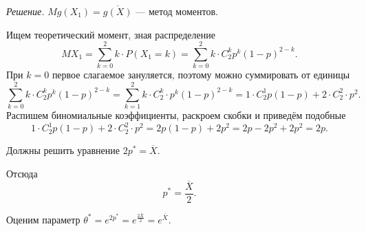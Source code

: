 \textit{Решение.} $Mg \left( X_1 \right) = \overline{g \left( X \right) }$ --- метод моментов.

Ищем теоретический момент, зная распределение
$$MX_1 =
  \sum \limits_{k = 0}^2 k \cdot P \left( X_1 = k \right) =
  \sum \limits_{k = 0}^2 k \cdot C_2^k p^k \left( 1 - p \right)^{2 - k}.$$
При $k = 0$ первое слагаемое зануляется, поэтому можно суммировать от единицы
$$ \sum \limits_{k = 0}^2 k \cdot C_2^k p^k \left( 1 - p \right)^{2 - k} =
  \sum \limits_{k = 1}^2 k \cdot C_2^k \cdot p^k \left( 1 - p \right)^{2 - k} =
  1 \cdot C_2^1 p \left( 1 - p \right) + 2 \cdot C_2^2 \cdot p^2.$$
Распишем биномиальные коэффициенты, раскроем скобки и приведём подобные
$$1 \cdot C_2^1 p \left( 1 - p \right) + 2 \cdot C_2^2 \cdot p^2 =
  2p \left( 1 - p \right) + 2p^2 =
  2p - 2p^2 + 2p^2 =
  2p.$$

Должны решить уравнение $2p^* = \overline{X}$.

Отсюда
$$p^* =
  \frac{ \overline{X}}{2}.$$

Оценим параметр $ \theta^* = e^{2p^*} = e^{ \frac{2 \overline{X}}{2}} = e^{ \overline{X}}$.
